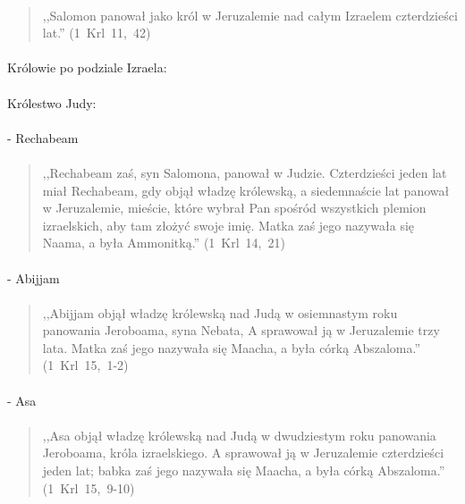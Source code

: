 \documentclass[10pt,a4paper,oneside]{article}
\begin{document}
\paragraph{}
\begin{quote}
,,Salomon panował jako król w Jeruzalemie nad całym Izraelem czterdzieści lat.'' \mbox{(1 Krl 11, 42)}
\end{quote}
\paragraph{}
Królowie po podziale Izraela:
\paragraph{}
Królestwo Judy:
\paragraph{}
- Rechabeam
\paragraph{}
\begin{quote}
,,Rechabeam zaś, syn Salomona, panował w Judzie. Czterdzieści jeden lat miał Rechabeam, gdy objął władzę królewską, a siedemnaście lat panował w Jeruzalemie, mieście, które wybrał Pan spośród wszystkich plemion izraelskich, aby tam złożyć swoje imię. Matka zaś jego nazywała się Naama, a była Ammonitką.'' \mbox{(1 Krl 14, 21)}
\end{quote}
\paragraph{}
- Abijjam
\paragraph{}
\begin{quote}
,,Abijjam objął władzę królewską nad Judą w osiemnastym roku panowania Jeroboama, syna Nebata, A sprawował ją w Jeruzalemie trzy lata. Matka zaś jego nazywała się Maacha, a była córką Abszaloma.'' \mbox{(1 Krl 15, 1-2)}
\end{quote}
\paragraph{}
- Asa
\paragraph{}
\begin{quote}
,,Asa objął władzę królewską nad Judą w dwudziestym roku panowania Jeroboama, króla izraelskiego. A sprawował ją w Jeruzalemie czterdzieści jeden lat; babka zaś jego nazywała się Maacha, a była córką Abszaloma.'' \mbox{(1 Krl 15, 9-10)}
\end{quote}
\end{document}
